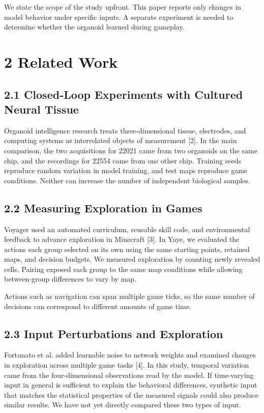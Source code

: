\documentclass{article}
\begin{document}
We state the scope of the study upfront. This paper reports only changes in model behavior under specific inputs. A separate experiment is needed to determine whether the organoid learned during gameplay.


\section*{2 Related Work}


\subsection*{2.1 Closed-Loop Experiments with Cultured Neural Tissue}


Organoid intelligence research treats three-dimensional tissue, electrodes, and computing systems as interrelated objects of measurement [2]. In the main comparison, the two acquisitions for 22021 came from two organoids on the same chip, and the recordings for 22554 came from one other chip. Training seeds reproduce random variation in model training, and test maps reproduce game conditions. Neither can increase the number of independent biological samples.


\subsection*{2.2 Measuring Exploration in Games}


Voyager used an automated curriculum, reusable skill code, and environmental feedback to advance exploration in Minecraft [3]. In Yaye, we evaluated the actions each group selected on its own using the same starting points, retained maps, and decision budgets. We measured exploration by counting newly revealed cells. Pairing exposed each group to the same map conditions while allowing between-group differences to vary by map.


Actions such as navigation can span multiple game ticks, so the same number of decisions can correspond to different amounts of game time.


\subsection*{2.3 Input Perturbations and Exploration}


Fortunato et al. added learnable noise to network weights and examined changes in exploration across multiple game tasks [4]. In this study, temporal variation came from the four-dimensional observations read by the model. If time-varying input in general is sufficient to explain the behavioral differences, synthetic input that matches the statistical properties of the measured signals could also produce similar results. We have not yet directly compared these two types of input.
\end{document}
